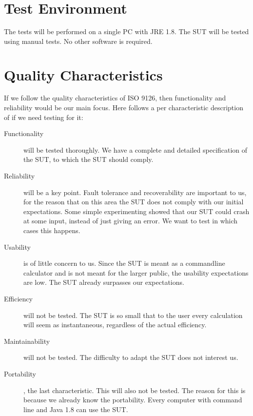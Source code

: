 \documentclass[11pt,a4paper]{article}
\begin{document}
\section{Test Environment}
The tests will be performed on a single PC with JRE 1.8. The SUT will be tested using manual tests. No other software is required. 

\section{Quality Characteristics}


If we follow the quality characteristics of ISO 9126, then functionality and reliability would be our main focus. Here follows a per characteristic description of if we need testing for it:
\begin{description}
	\item[Functionality] will be tested thoroughly. We have a complete and detailed specification of the SUT, to which the SUT should comply.
	\item[Reliability] will be a key point. Fault tolerance and recoverability are important to us, for the reason that on this area the SUT does not comply with our initial expectations. Some simple experimenting showed that our SUT could crash at some input, instead of just giving an error. We want to test in which cases this happens.
	\item[Usability] is of little concern to us. Since the SUT is meant as a commandline calculator and is not meant for the larger public, the usability expectations are low. The SUT already surpasses our expectations.
	\item[Efficiency] will not be tested. The SUT is so small that to the user every calculation will seem as instantaneous, regardless of the actual efficiency.
	\item[Maintainability] will not be tested. The difficulty to adapt the SUT does not interest us.
	\item[Portability], the last characteristic. This will also not be tested. The reason for this is because we already know the portability. Every computer with command line and Java 1.8 can use the SUT.
\end{description}
\end{document}
